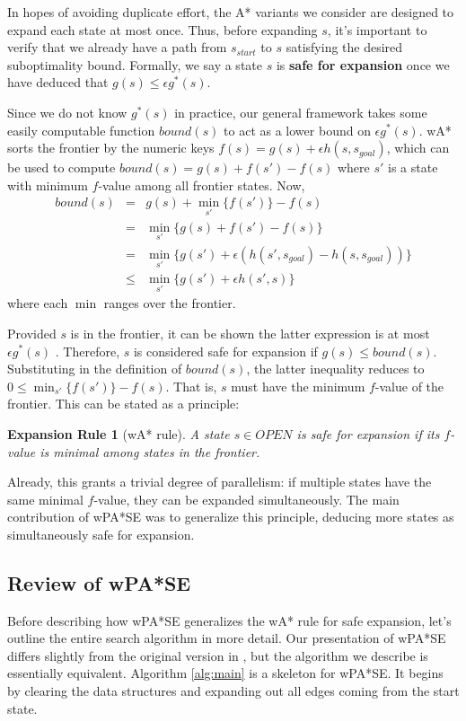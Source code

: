 \documentclass[letterpaper]{article}
\newtheorem{rul}{Expansion Rule}
\begin{document}
In hopes of avoiding duplicate effort, the A* variants we consider are designed to expand each state at most once. Thus, before expanding $s$, it's important to verify that we already have a path from $s_{start}$ to $s$ satisfying the desired suboptimality bound. Formally, we say a state $s$ is \textbf{safe for expansion} once we have deduced that $g(s) \le \epsilon g^*(s)$.

Since we do not know $g^*(s)$ in practice, our general framework takes some easily computable function $bound(s)$ to act as a lower bound on $\epsilon g^*(s)$. wA* sorts the frontier by the numeric keys $f(s) = g(s) + \epsilon h(s,s_{goal})$, which can be used to compute $bound(s) = g(s) + f(s') - f(s)$ where $s'$ is a state with minimum $f$-value among all frontier states. Now,
\begin{eqnarray*}
bound(s) &=& g(s) + \min_{s'}\{f(s')\} - f(s)
\\&=& \min_{s'}\{g(s) + f(s') - f(s)\}
\\&=& \min_{s'}\{g(s') + \epsilon\left(h(s',s_{goal}) - h(s,s_{goal})\right)\}
\\&\le& \min_{s'}\{g(s') + \epsilon h(s',s)\}
\end{eqnarray*}
where each $\min$ ranges over the frontier.

Provided $s$ is in the frontier, it can be shown the latter expression is at most $\epsilon g^*(s)$ \cite{WA}. Therefore, $s$ is considered safe for expansion if $g(s) \le bound(s)$. Substituting in the definition of $bound(s)$, the latter inequality reduces to $0 \le \min_{s'}\{f(s')\} - f(s)$. That is, $s$ must have the minimum $f$-value of the frontier. This can be stated as a principle:

\begin{rul}[wA* rule]
A state $s\in OPEN$ is safe for expansion if its $f$-value is minimal among states in the frontier.
\end{rul}

Already, this grants a trivial degree of parallelism: if multiple states have the same minimal $f$-value, they can be expanded simultaneously. The main contribution of wPA*SE was to generalize this principle, deducing more states as simultaneously safe for expansion.

\subsection{Review of wPA*SE}

Before describing how wPA*SE generalizes the wA* rule for safe expansion, let's outline the entire search algorithm in more detail. Our presentation of wPA*SE differs slightly from the original version in \cite{phillips2014pa}, but the algorithm we describe is essentially equivalent. Algorithm \ref{alg:main} is a skeleton for wPA*SE. It begins by clearing the data structures and expanding out all edges coming from the start state.
\end{document}
